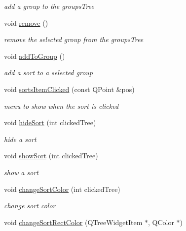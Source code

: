 \begin{DoxyCompactItemize}
\begin{DoxyCompactList}\small\item\em add a group to the groups\-Tree \end{DoxyCompactList}\item 
\hypertarget{class_tree_area_af231946c277606cf3613f82ffd859a01}{void \hyperlink{class_tree_area_af231946c277606cf3613f82ffd859a01}{remove} ()}\label{class_tree_area_af231946c277606cf3613f82ffd859a01}

\begin{DoxyCompactList}\small\item\em remove the selected group from the groups\-Tree \end{DoxyCompactList}\item 
\hypertarget{class_tree_area_a47f535fca68dd94484227f4669cc773d}{void \hyperlink{class_tree_area_a47f535fca68dd94484227f4669cc773d}{add\-To\-Group} ()}\label{class_tree_area_a47f535fca68dd94484227f4669cc773d}

\begin{DoxyCompactList}\small\item\em add a sort to a selected group \end{DoxyCompactList}\item 
\hypertarget{class_tree_area_a8a8afdc75c8e16720f9dde739d1f53e0}{void \hyperlink{class_tree_area_a8a8afdc75c8e16720f9dde739d1f53e0}{sorts\-Item\-Clicked} (const \-Q\-Point \&pos)}\label{class_tree_area_a8a8afdc75c8e16720f9dde739d1f53e0}

\begin{DoxyCompactList}\small\item\em menu to show when the sort is clicked \end{DoxyCompactList}\item 
void \hyperlink{class_tree_area_ad8651281efec4086ec668b43f1d528d9}{hide\-Sort} (int clicked\-Tree)
\begin{DoxyCompactList}\small\item\em hide a sort \end{DoxyCompactList}\item 
void \hyperlink{class_tree_area_a89ea1654d33d7d83a7bbb8b3a79b60ad}{show\-Sort} (int clicked\-Tree)
\begin{DoxyCompactList}\small\item\em show a sort \end{DoxyCompactList}\item 
void \hyperlink{class_tree_area_a5277c42469c5dab4cc117441ed2d872a}{change\-Sort\-Color} (int clicked\-Tree)
\begin{DoxyCompactList}\small\item\em change sort color \end{DoxyCompactList}\item 
\hypertarget{class_tree_area_a5eb847a42ee5dbcdbfc8d419b322197e}{void \hyperlink{class_tree_area_a5eb847a42ee5dbcdbfc8d419b322197e}{change\-Sort\-Rect\-Color} (\-Q\-Tree\-Widget\-Item $\ast$, \-Q\-Color $\ast$)}\label{class_tree_area_a5eb847a42ee5dbcdbfc8d419b322197e}


\end{DoxyCompactItemize}

